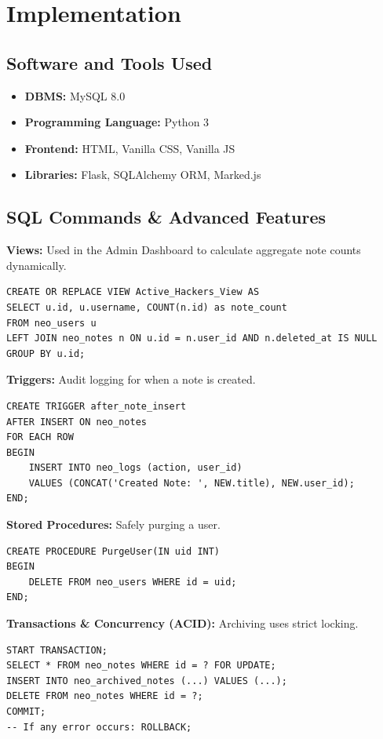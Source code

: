 \documentclass[12pt,a4paper]{report}
\begin{document}
\chapter{Implementation}
\section{Software and Tools Used}
\begin{itemize}
    \item \textbf{DBMS:} MySQL 8.0
    \item \textbf{Programming Language:} Python 3
    \item \textbf{Frontend:} HTML, Vanilla CSS, Vanilla JS
    \item \textbf{Libraries:} Flask, SQLAlchemy ORM, Marked.js
\end{itemize}

\section{SQL Commands \& Advanced Features}

\textbf{Views:} Used in the Admin Dashboard to calculate aggregate note counts dynamically.
\begin{verbatim}
CREATE OR REPLACE VIEW Active_Hackers_View AS
SELECT u.id, u.username, COUNT(n.id) as note_count
FROM neo_users u
LEFT JOIN neo_notes n ON u.id = n.user_id AND n.deleted_at IS NULL
GROUP BY u.id;
\end{verbatim}

\textbf{Triggers:} Audit logging for when a note is created.
\begin{verbatim}
CREATE TRIGGER after_note_insert
AFTER INSERT ON neo_notes
FOR EACH ROW
BEGIN
    INSERT INTO neo_logs (action, user_id)
    VALUES (CONCAT('Created Note: ', NEW.title), NEW.user_id);
END;
\end{verbatim}

\textbf{Stored Procedures:} Safely purging a user.
\begin{verbatim}
CREATE PROCEDURE PurgeUser(IN uid INT)
BEGIN
    DELETE FROM neo_users WHERE id = uid;
END;
\end{verbatim}

\textbf{Transactions \& Concurrency (ACID):} Archiving uses strict locking.
\begin{verbatim}
START TRANSACTION;
SELECT * FROM neo_notes WHERE id = ? FOR UPDATE;
INSERT INTO neo_archived_notes (...) VALUES (...);
DELETE FROM neo_notes WHERE id = ?;
COMMIT;
-- If any error occurs: ROLLBACK;
\end{verbatim}
\end{document}
